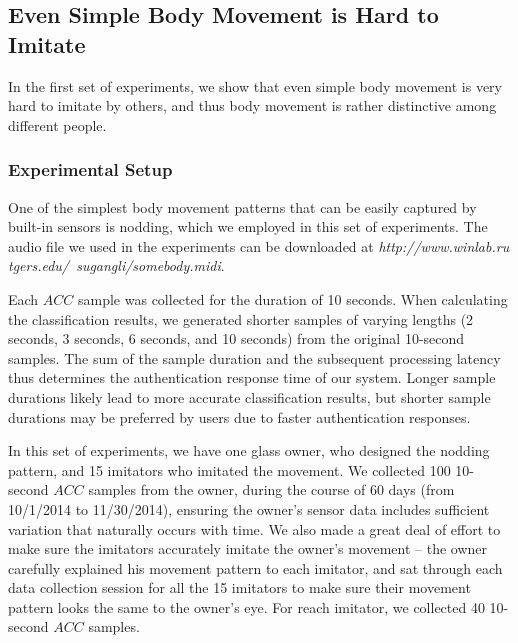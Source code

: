 \subsection{Even Simple Body Movement is Hard to Imitate}\label{sec:experimenr2}
In the first set of experiments, we show that even simple body movement is very hard to imitate by others, and thus body movement is rather distinctive among different people.

\subsubsection{Experimental Setup}
One of the simplest body movement patterns that can be easily captured by built-in sensors is nodding, which we employed in this set of experiments. The audio file we used in the experiments can be downloaded at \emph{http://www.winlab.ru\\
tgers.edu/~sugangli/somebody.midi}.

Each $ACC$ sample was collected for the duration of 10 seconds. When calculating the classification results, we generated shorter samples of varying lengths (2 seconds, 3 seconds, 6 seconds, and 10 seconds) from the original 10-second samples. The sum of the sample duration and the subsequent processing latency thus determines the authentication response time of our system. Longer sample durations likely lead to more accurate classification results, but shorter sample durations may be preferred by users due to faster authentication responses.

In this set of experiments, we have one glass owner, who designed the nodding pattern,  and 15 imitators who imitated the movement. We collected 100 10-second $ACC$ samples from the owner, during the course of 60 days (from 10/1/2014 to 11/30/2014), ensuring the owner's sensor data includes sufficient variation that naturally occurs with time. We also made a great deal of effort to make sure the imitators accurately imitate the owner's movement -- the owner carefully explained his movement pattern to each imitator, and sat through each data collection session for all the 15 imitators to make sure their movement pattern looks the same to the owner's eye. For reach imitator, we collected 40 10-second $ACC$ samples.






